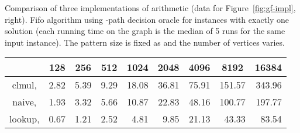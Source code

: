 \documentclass[11pt]{article}
\begin{document}
Comparison of three implementations of  arithmetic (data for Figure~\ref{fig:gf-impl}, right).
Fifo algorithm using -path decision oracle for instances with exactly one solution (each running time on the graph is the median of 5 runs for the same input instance). 
The pattern size is fixed as  and the number of vertices  varies.

{\scriptsize
\begin{center}
\begin{tabular}{|c|r|r|r|r|r|r|r|r|}\hline
\multicolumn{1}{|c|}{} & \multicolumn{1}{|c|}{128}  & \multicolumn{1}{|c|}{256}  & \multicolumn{1}{|c|}{512}  & \multicolumn{1}{|c|}{1024}  & \multicolumn{1}{|c|}{2048}  & \multicolumn{1}{|c|}{4096}  & \multicolumn{1}{|c|}{8192}  & \multicolumn{1}{|c|}{16384} \\\hline
clmul,  & 2.82 & 5.39 & 9.29 & 18.08 & 36.81 & 75.91 & 151.57 & 343.96\\
naive,  & 1.93 & 3.32 & 5.66 & 10.87 & 22.83 & 48.16 & 100.77 & 197.77\\
lookup,  & 0.67 & 1.21 & 2.52 & 4.81 & 9.85 & 21.13 & 43.33 & 83.54\\\hline
\end{tabular}
\end{center}
}
\end{document}
